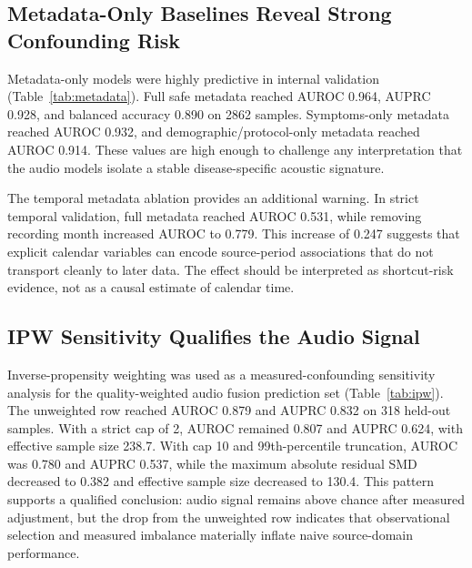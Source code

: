 \documentclass[journal]{IEEEtran}
\begin{document}
\subsection{Metadata-Only Baselines Reveal Strong Confounding Risk}
Metadata-only models were highly predictive in internal validation (Table~\ref{tab:metadata}). Full safe metadata reached AUROC 0.964, AUPRC 0.928, and balanced accuracy 0.890 on 2862 samples. Symptoms-only metadata reached AUROC 0.932, and demographic/protocol-only metadata reached AUROC 0.914. These values are high enough to challenge any interpretation that the audio models isolate a stable disease-specific acoustic signature.

The temporal metadata ablation provides an additional warning. In strict temporal validation, full metadata reached AUROC 0.531, while removing recording month increased AUROC to 0.779. This increase of 0.247 suggests that explicit calendar variables can encode source-period associations that do not transport cleanly to later data. The effect should be interpreted as shortcut-risk evidence, not as a causal estimate of calendar time.

\subsection{IPW Sensitivity Qualifies the Audio Signal}
Inverse-propensity weighting was used as a measured-confounding sensitivity analysis for the quality-weighted audio fusion prediction set (Table~\ref{tab:ipw}). The unweighted row reached AUROC 0.879 and AUPRC 0.832 on 318 held-out samples. With a strict cap of 2, AUROC remained 0.807 and AUPRC 0.624, with effective sample size 238.7. With cap 10 and 99th-percentile truncation, AUROC was 0.780 and AUPRC 0.537, while the maximum absolute residual SMD decreased to 0.382 and effective sample size decreased to 130.4. This pattern supports a qualified conclusion: audio signal remains above chance after measured adjustment, but the drop from the unweighted row indicates that observational selection and measured imbalance materially inflate naive source-domain performance.

\begin{table}[t]
\caption{Inverse-propensity weighting sensitivity analysis for quality-weighted audio fusion. ESS denotes effective sample size; SMD denotes standardized mean difference.}
\label{tab:ipw}
\centering
\footnotesize
{}
\end{table}
\end{document}
